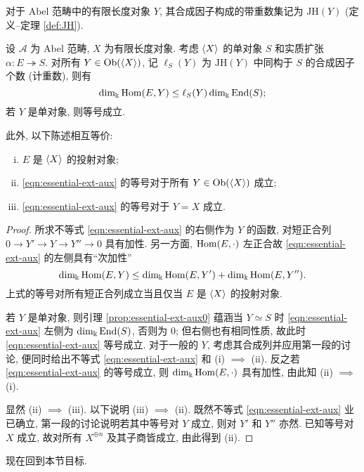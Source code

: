 对于 Abel 范畴中的有限长度对象 $Y$, 其合成因子构成的带重数集记为 $\mathrm{JH}(Y)$ (定义--定理 \ref{def:JH}).

\begin{lemma}\label{prop:essential-ext}
	设 $\mathcal{A}$ 为 Abel 范畴, $X$ 为有限长度对象. 考虑 $\left\langle X \right\rangle$ 的单对象 $S$ 和实质扩张 $\alpha: E \twoheadrightarrow S$. 对所有 $Y \in \operatorname{Ob}(\left\langle X \right\rangle)$, 记 $\ell_S(Y)$ 为 $\mathrm{JH}(Y)$ 中同构于 $S$ 的合成因子个数 (计重数), 则有
	\begin{equation}\label{eqn:essential-ext-aux}
		\dim_{\Bbbk} \operatorname{Hom}(E, Y) \leq \ell_S(Y) \dim_{\Bbbk} \operatorname{End}(S);
	\end{equation}
	若 $Y$ 是单对象, 则等号成立.
	
	此外, 以下陈述相互等价:
	\begin{enumerate}[(i)]
		\item $E$ 是 $\left\langle X \right\rangle$ 的投射对象;
		\item \eqref{eqn:essential-ext-aux} 的等号对于所有 $Y \in \operatorname{Ob}(\left\langle X \right\rangle)$ 成立;
		\item \eqref{eqn:essential-ext-aux} 的等号对于 $Y = X$ 成立.
	\end{enumerate}
\end{lemma}
\begin{proof}
	所求不等式 \eqref{eqn:essential-ext-aux} 的右侧作为 $Y$ 的函数, 对短正合列 $0 \to Y' \to Y \to Y'' \to 0$ 具有加性. 另一方面, $\operatorname{Hom}(E, \cdot)$ 左正合故 \eqref{eqn:essential-ext-aux} 的左侧具有``次加性''
	\[ \dim_{\Bbbk} \operatorname{Hom}(E, Y) \leq \dim_{\Bbbk} \operatorname{Hom}(E, Y') + \dim_{\Bbbk} \operatorname{Hom}(E, Y''). \]
	上式的等号对所有短正合列成立当且仅当 $E$ 是 $\left\langle X \right\rangle$ 的投射对象.
	
	若 $Y$ 是单对象, 则引理 \ref{prop:essential-ext-aux0} 蕴涵当 $Y \simeq S$ 时 \eqref{eqn:essential-ext-aux} 左侧为 $\dim_{\Bbbk} \operatorname{End}(S)$, 否则为 $0$; 但右侧也有相同性质, 故此时 \eqref{eqn:essential-ext-aux} 等号成立. 对于一般的 $Y$, 考虑其合成列并应用第一段的讨论, 便同时给出不等式 \eqref{eqn:essential-ext-aux} 和 (i) $\implies$ (ii). 反之若 \eqref{eqn:essential-ext-aux} 的等号成立, 则 $\dim_{\Bbbk} \operatorname{Hom}(E, \cdot)$ 具有加性, 由此知 (ii) $\implies$ (i).
	
	显然 (ii) $\implies$ (iii). 以下说明 (iii) $\implies$ (ii). 既然不等式 \eqref{eqn:essential-ext-aux} 业已确立, 第一段的讨论说明若其中等号对 $Y$ 成立, 则对 $Y'$ 和 $Y''$ 亦然. 已知等号对 $X$ 成立, 故对所有 $X^{\oplus n}$ 及其子商皆成立, 由此得到 (ii).
\end{proof}

现在回到本节目标.

